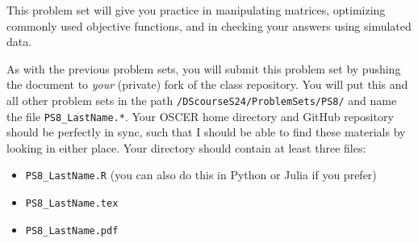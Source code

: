 \documentclass[12pt,english]{exam}
\begin{document}
This problem set will give you practice in manipulating matrices, optimizing commonly used objective functions, and in checking your answers using simulated data.

As with the previous problem sets, you will submit this problem set by pushing the document to \emph{your} (private) fork of the class repository. You will put this and all other problem sets in the path \texttt{/DScourseS24/ProblemSets/PS8/} and name the file \texttt{PS8\_LastName.*}. Your OSCER home directory and GitHub repository should be perfectly in sync, such that I should be able to find these materials by looking in either place. Your directory should contain at least three files:
\begin{itemize}
    \item \texttt{PS8\_LastName.R} (you can also do this in Python or Julia if you prefer)
    \item \texttt{PS8\_LastName.tex}
    \item \texttt{PS8\_LastName.pdf}
\end{itemize}
\end{document}
